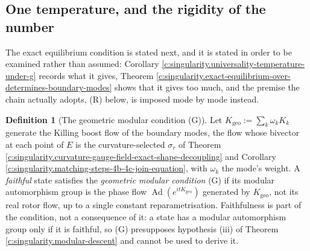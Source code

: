 \documentclass[11pt]{article}
\theoremstyle{definition}
\newtheorem{definition}[theorem]{Definition}
\theoremstyle{plain}
\newcommand{\changedmark}[2]{\marginpar{\raggedright\scriptsize\color{#1}#2}}
\begin{document}
\subsection*{One temperature, and the rigidity of the number}
\label{c:note.singularity.setting-one-temperature-rigidity-number}
The exact equilibrium condition is stated next, and it is stated in order to be examined rather than assumed: Corollary \ref{c:singularity.universality-temperature-under-g} records what it gives, Theorem \ref{c:singularity.exact-equilibrium-over-determines-boundary-modes} shows that it gives too much, and the premise the chain actually adopts, (R) below, is imposed mode by mode instead.

\begin{definition}[The geometric modular condition (G)]\label{c:obj.singularity.geometric-modular-condition-g}
\changedmark{BurntOrange}{changed since the deposit}
Let $K_{\mathrm{geo}} := \sum_k \omega_k K_k$ generate the Killing boost flow of the boundary modes, the flow whose bivector at each point of $E$ is the curvature-selected $\sigma_r$ of Theorem \ref{c:singularity.curvature-gauge-field-exact-shape-decoupling} and Corollary \ref{c:singularity.matching-steps-4b-4c-join-equation}, with $\omega_k$ the mode's weight. A \emph{faithful} state satisfies the \emph{geometric modular condition} (G) if its modular automorphism group is the phase flow $\operatorname{Ad}(e^{itK_{\mathrm{geo}}})$ generated by $K_{\mathrm{geo}}$, not its real rotor flow, up to a single constant reparametrisation. Faithfulness is part of the condition, not a consequence of it: a state has a modular automorphism group only if it is faithful, so (G) presupposes hypothesis (iii) of Theorem \ref{c:singularity.modular-descent} and cannot be used to derive it.
\end{definition}
\end{document}
